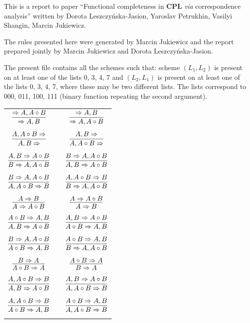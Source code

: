 \documentclass[11pt]{article}
\begin{document}
	
	This is a report to paper ``Functional completeness in \textbf{CPL} \textit{via} correspondence analysis'' written by Dorota Leszczy\'{n}ska-Jasion, 
	Yaroslav Petrukhin, Vasilyi Shangin, Marcin Jukiewicz. 
	
	The rules presented here were generated by Marcin Jukiewicz and the report prepared jointly by Marcin Jukiewicz and Dorota Leszczy\'{n}ska-Jasion.
	
	The present file contains all the schemes such that: scheme $(L_1, L_2)$ is present on at least one of the lists 0, 3, 4, 7 and $(L_2, L_1)$ is present on at least one of the lists 0, 3, 4, 7, where these may be two different lists. The lists correspond to 000, 011, 100, 111 (binary function repeating the second argument).
	
	\bigskip
	
\begin{center}

\begin{tabular}{ccc}
$\infer{\Rightarrow A, B}{\Rightarrow A, A\circ B}$ && $\infer{\Rightarrow A, A\circ B}{\Rightarrow A, B}$ \\
&& \\
$\infer{A, B\Rightarrow }{A, A\circ B\Rightarrow }$ && $\infer{A, A\circ B\Rightarrow }{A, B\Rightarrow }$ \\
&& \\
$\infer{B\Rightarrow A, A\circ B}{A, B\Rightarrow A\circ B}$ && $\infer{A, B\Rightarrow A\circ B}{B\Rightarrow A, A\circ B}$ \\
&& \\
$\infer{A, A\circ B\Rightarrow B}{B\Rightarrow A, A\circ B}$ && $\infer{B\Rightarrow A, A\circ B}{A, A\circ B\Rightarrow B}$ \\
&& \\
$\infer{A\Rightarrow A\circ B}{A\Rightarrow B}$ && $\infer{A\Rightarrow B}{A\Rightarrow A\circ B}$ \\
&& \\
$\infer{A, B\Rightarrow A\circ B}{A\circ B\Rightarrow A, B}$ && $\infer{A\circ B\Rightarrow A, B}{A, B\Rightarrow A\circ B}$ \\
&& \\
$\infer{A\circ B\Rightarrow A, B}{B\Rightarrow A, A\circ B}$ && $\infer{B\Rightarrow A, A\circ B}{A\circ B\Rightarrow A, B}$ \\
&& \\
$\infer{A\circ B\Rightarrow A}{B\Rightarrow A}$ && $\infer{B\Rightarrow A}{A\circ B\Rightarrow A}$ \\
&& \\
$\infer{A, B\Rightarrow A\circ B}{A, A\circ B\Rightarrow B}$ && $\infer{A, A\circ B\Rightarrow B}{A, B\Rightarrow A\circ B}$ \\
&& \\
$\infer{A\circ B\Rightarrow A, B}{A, A\circ B\Rightarrow B}$ && $\infer{A, A\circ B\Rightarrow B}{A\circ B\Rightarrow A, B}$ \\
&& \\


\end{tabular}
\end{center}
\end{document}
